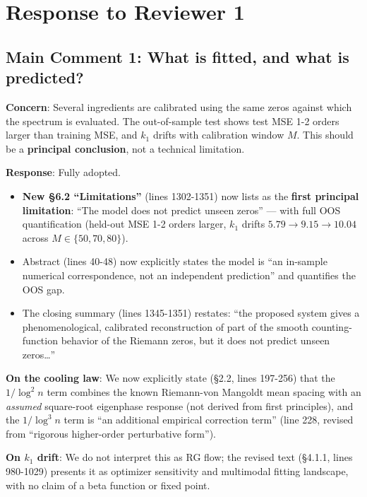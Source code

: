 \documentclass[11pt]{article}
\begin{document}
\section*{Response to Reviewer 1}

\subsection*{Main Comment 1: What is fitted, and what is predicted?}

\textbf{Concern}: Several ingredients are calibrated using the same zeros against which the spectrum is evaluated. The out-of-sample test shows test MSE 1-2 orders larger than training MSE, and $k_1$ drifts with calibration window $M$. This should be a \textbf{principal conclusion}, not a technical limitation.

\textbf{Response}: Fully adopted.

\begin{itemize}[leftmargin=2em]
\item \textbf{New \S6.2 ``Limitations''} (lines 1302-1351) now lists as the \textbf{first principal limitation}: ``The model does not predict unseen zeros'' --- with full OOS quantification (held-out MSE 1-2 orders larger, $k_1$ drifts $5.79 \to 9.15 \to 10.04$ across $M \in \{50,70,80\}$).
\item Abstract (lines 40-48) now explicitly states the model is ``an in-sample numerical correspondence, not an independent prediction'' and quantifies the OOS gap.
\item The closing summary (lines 1345-1351) restates: ``the proposed system gives a phenomenological, calibrated reconstruction of part of the smooth counting-function behavior of the Riemann zeros, but it does not predict unseen zeros\ldots''
\end{itemize}

\textbf{On the cooling law}: We now explicitly state (\S2.2, lines 197-256) that the $1/\log^2 n$ term combines the known Riemann-von Mangoldt mean spacing with an \emph{assumed} square-root eigenphase response (not derived from first principles), and the $1/\log^3 n$ term is ``an additional empirical correction term'' (line 228, revised from ``rigorous higher-order perturbative form'').

\textbf{On $k_1$ drift}: We do not interpret this as RG flow; the revised text (\S4.1.1, lines 980-1029) presents it as optimizer sensitivity and multimodal fitting landscape, with no claim of a beta function or fixed point.
\end{document}
